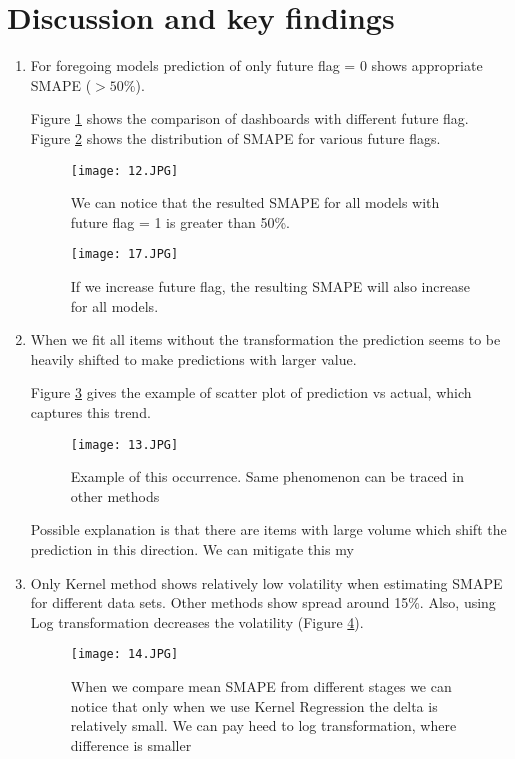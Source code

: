 \documentclass{article}
\begin{document}
\section{Discussion and key findings}
\begin{enumerate}  
\item For foregoing models prediction of only future flag = 0 shows appropriate SMAPE ($> 50\%$). 

Figure \ref{fig:for_foregoing_models} shows the comparison of dashboards with different future flag. 
Figure \ref{fig:for_foregoing models2} shows the distribution of SMAPE for various future flags. 

\begin{figure}[H]
\texttt{[image: 12.JPG]}
\centering
\caption{We can notice that the resulted SMAPE for all models with future flag = 1 is greater than 50\%.}
\label{fig:for_foregoing_models}
\end{figure}

\begin{figure}[H]
\texttt{[image: 17.JPG]}
\centering
\caption{If we increase future flag, the resulting SMAPE will also increase for all models.}
\label{fig:for_foregoing models2}
\end{figure}

\item When we fit all items without the transformation the prediction seems to be heavily shifted to make predictions with larger value.

Figure \ref{fig:when_we_fit_all} gives the example of scatter plot of prediction vs actual, which captures this trend. 

\begin{figure}[H]
\texttt{[image: 13.JPG]}
\centering
\caption{Example of this occurrence. Same phenomenon can be traced in other methods }
\label{fig:when_we_fit_all}
\end{figure}
Possible explanation is that there are items with large volume which shift the prediction in this direction. We can mitigate this my 
\item Only Kernel method shows relatively low volatility when estimating SMAPE for different data sets. Other methods show spread around 15\%. Also, using Log transformation decreases the volatility (Figure \ref{fig:only_kernel_method}).


\begin{figure}[H]
\texttt{[image: 14.JPG]}
\centering
\caption{When we compare mean SMAPE from different stages we can notice that only when we use Kernel Regression the delta is relatively small. We can pay heed to log transformation, where difference is smaller}
\label{fig:only_kernel_method}
\end{figure}


\end{enumerate}
\end{document}
